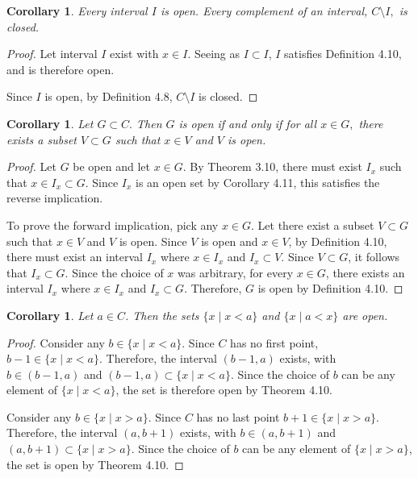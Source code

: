 \documentclass{amsart}
\newtheorem{corollary}[theorem]{Corollary}
\newcommand{\1}{\mathds{1}}
\numberwithin{equation}{section}
\numberwithin{theorem}{section}
\begin{document}
\begin{corollary}  Every interval $I$ is open.  Every complement of an interval, $C \setminus I,$ is closed.
\end{corollary}

\begin{proof}
	Let interval $I$ exist with $x\in I$. Seeing as $I\subset I$, $I$ satisfies Definition 4.10, and is therefore open.
	
	Since $I$ is open, by Definition 4.8, $C\setminus I$ is closed.
\end{proof}

\begin{corollary} Let $G\subset C.$ Then $G$ is open if and only if for all $x\in G,$ there exists a subset $V\subset G$ such that $x\in V$ and $V$ is open. 
\end{corollary} 

\begin{proof}
	Let $G$ be open and let $x\in G$. By Theorem 3.10, there must exist $I_x$ such that $x \in I_x \subset G$. Since $I_x$ is an open set by Corollary 4.11, this satisfies the reverse implication.
	
	To prove the forward implication, pick any $x\in G$. Let there exist a subset $V\subset G$ such that $x\in V$ and $V$ is open. Since $V$ is open and $x\in V$, by Definition 4.10, there must exist an interval $I_x$ where $x\in I_x$ and $I_x\subset V$. Since $V\subset G$, it follows that $I_x\subset G$. Since the choice of $x$ was arbitrary, for every $x\in G$, there exists an interval $I_x$ where $x\in I_x$ and $I_x\subset G$. Therefore, $G$ is open by Definition 4.10.
\end{proof}

\begin{corollary}  Let $a \in C$.  Then the sets $\{ x \mid x < a\}$ and $\{x \mid a < x \}$ are open.
\end{corollary}

\begin{proof}
	Consider any $b\in \{ x \mid x < a\}$. Since $C$ has no first point, $b-1\in \{ x \mid x < a\}$. Therefore, the interval $(b-1,a)$ exists, with $b\in (b-1,a)$ and $(b-1,a)\subset \{ x \mid x < a\}$. Since the choice of $b$ can be any element of $\{ x \mid x < a\}$, the set is therefore open by Theorem 4.10. 
	
	Consider any $b\in \{ x \mid x > a\}$. Since $C$ has no last point $b+1\in \{ x \mid x > a\}$. Therefore, the interval $(a,b+1)$ exists, with $b\in (a,b+1)$ and $(a,b+1)\subset \{ x \mid x > a\}$. Since the choice of $b$ can be any element of $\{ x \mid x > a\}$, the set is open by Theorem 4.10.
\end{proof}
\end{document}
